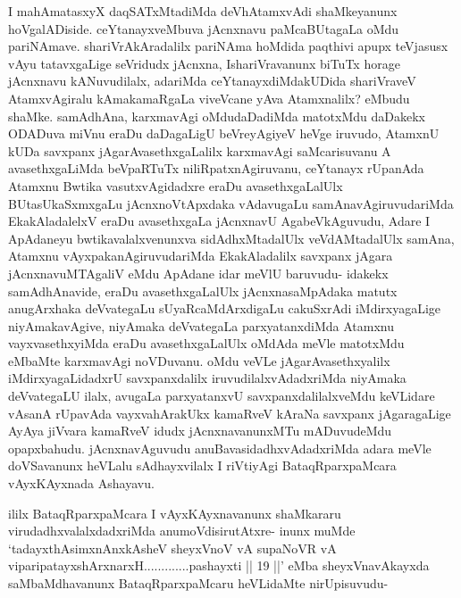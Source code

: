 
\begin{artha}
I mahAmatasxyX daqSATxMtadiMda deVhAtamxvAdi shaMkeyanunx hoVgalADiside. ceYtanayxveMbuva jAcnxnavu paMcaBUtagaLa oMdu pariNAmave. shariVrAkAradalilx pariNAma hoMdida paqthivi apupx teVjasusx vAyu tatavxgaLige seVridudx jAcnxna, IshariVravanunx biTuTx horage jAcnxnavu kANuvudilalx, adariMda ceYtanayxdiMdakUDida shariVraveV AtamxvAgiralu kAmakamaRgaLa viveVcane yAva Atamxnalilx? eMbudu shaMke. samAdhAna, karxmavAgi oMdudaDadiMda matotxMdu daDakekx ODADuva miVnu eraDu daDagaLigU beVreyAgiyeV heVge iruvudo, AtamxnU kUDa savxpanx jAgarAvasethxgaLalilx karxmavAgi saMcarisuvanu A avasethxgaLiMda beVpaRTuTx niliRpatxnAgiruvanu, ceYtanayx rUpanAda Atamxnu Bwtika vasutxvAgidadxre eraDu avasethxgaLalUlx BUtasUkaSxmxgaLu jAcnxnoVtApxdaka vAdavugaLu samAnavAgiruvudariMda EkakAladalelxV eraDu avasethxgaLa jAcnxnavU AgabeVkAguvudu, Adare I ApAdaneyu bwtikavalalxvenunxva sidAdhxMtadalUlx  veVdAMtadalUlx samAna, Atamxnu vAyxpakanAgiruvudariMda EkakAladalilx savxpanx jAgara jAcnxnavuMTAgaliV eMdu ApAdane idar meVlU baruvudu- idakekx samAdhAnavide, eraDu avasethxgaLalUlx jAcnxnasaMpAdaka matutx anugArxhaka deVvategaLu sUyaRcaMdArxdigaLu cakuSxrAdi iMdirxyagaLige niyAmakavAgive, niyAmaka deVvategaLa parxyatanxdiMda Atamxnu vayxvasethxyiMda eraDu avasethxgaLalUlx oMdAda meVle matotxMdu eMbaMte karxmavAgi noVDuvanu. oMdu veVLe jAgarAvasethxyalilx iMdirxyagaLidadxrU savxpanxdalilx iruvudilalxvAdadxriMda niyAmaka deVvategaLU ilalx, avugaLa parxyatanxvU savxpanxdalilalxveMdu keVLidare vAsanA rUpavAda vayxvahArakUkx kamaRveV kAraNa savxpanx jAgaragaLige AyAya jiVvara kamaRveV idudx jAcnxnavanunxMTu mADuvudeMdu opapxbahudu. jAcnxnavAguvudu anuBavasidadhxvAdadxriMda adara meVle doVSavanunx heVLalu sAdhayxvilalx I riVtiyAgi BataqRparxpaMcara vAyxKAyxnada Ashayavu. 
\end{artha}%


\begin{artha}
ililx BataqRparxpaMcara I vAyxKAyxnavanunx shaMkararu virudadhxvalalxdadxriMda anumoVdisirutAtxre- inunx muMde `tadayxthA\s simxnAnxkAsheV sheyxVnoV vA supaNoVR vA viparipatayxshArxnarxH.............pashayxti || 19 ||' eMba sheyxVnavAkayxda saMbaMdhavanunx BataqRparxpaMcaru heVLidaMte nirUpisuvudu-
\end{artha}


